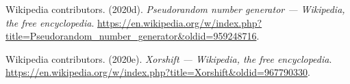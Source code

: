 \documentclass[
]{article}
\newlength{\cslhangindent}
\newenvironment{cslreferences}%
  {\setlength{\parindent}{0pt}%
  \everypar{\setlength{\hangindent}{\cslhangindent}}\ignorespaces}%
  {\par}
\begin{document}
\begin{cslreferences}
\leavevmode\hypertarget{ref-wiki:prng}{}%
Wikipedia contributors. (2020d). \emph{Pseudorandom number generator ---
Wikipedia, the free encyclopedia}.
\url{https://en.wikipedia.org/w/index.php?title=Pseudorandom_number_generator\&oldid=959248716}.

\leavevmode\hypertarget{ref-wiki:xorshift}{}%
Wikipedia contributors. (2020e). \emph{Xorshift --- Wikipedia, the free
encyclopedia}.
\url{https://en.wikipedia.org/w/index.php?title=Xorshift\&oldid=967790330}.
\end{cslreferences}
\end{document}
